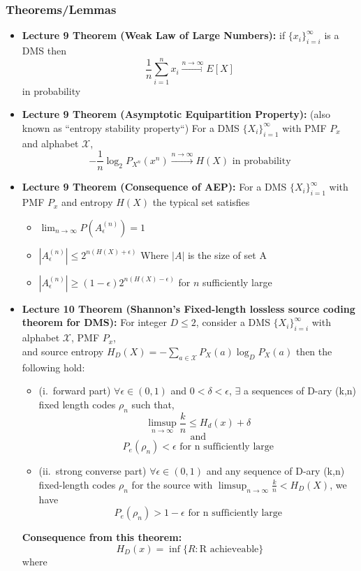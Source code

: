 \documentclass{article}
\begin{document}
\subsubsection{Theorems/Lemmas}
\begin{itemize}
    \item \textbf{Lecture 9 Theorem (Weak Law of Large Numbers):} if \(\{x_i\}^{\infty}_{i=i}\) is a DMS then 
\[\frac{1}{n} \sum^n_{i=1} x_i \xrightarrow{n\to\infty} E[X]\] in probability
    \item \textbf{Lecture 9 Theorem (Asymptotic Equipartition Property):} (also known as ``entropy stability property``)
    For a DMS \(\{X_i\}^\infty_{i=1}\) with PMF \(P_x\) and alphabet \(\mathcal{X}\),
    \[-\frac{1}{n} \log_2 P_{X^n}(x^n) \xrightarrow[]{n\to\infty}H(X) \text{ in probability}\]
    \item \textbf{Lecture 9 Theorem (Consequence of AEP):} For a DMS \(\{X_i\}_{i=1}^\infty\) with PMF \(P_x\) and entropy \(H(X)\) the typical set satisfies
    \begin{itemize}
        \item \(\lim_{n\to\infty} P(A_{\epsilon}^{(n)})=1\)
        \item \(|A_\epsilon^{(n)}| \leq 2^{n(H(X)+\epsilon)}\) Where \(|A|\) is the size of set A
        \item \(|A_\epsilon^{(n)}| \geq (1-\epsilon)2^{n(H(X)-\epsilon)}\) for \(n\) sufficiently large
    \end{itemize}
    \item \textbf{Lecture 10 Theorem (Shannon's Fixed-length lossless source coding theorem for DMS):} For integer \(D\leq2\), consider a DMS \(\{X_i\}^{\infty}_{i=i}\) with alphabet \(\mathcal{X}\), PMF \(P_x\), \\and
    source entropy \(H_D(X) = - \sum_{a \in \mathcal{X}} P_X(a) \log_D P_X(a)\) then the following hold:
    \begin{itemize}
        \item (i.\ forward part) \(\forall \epsilon \in (0,1)\) and \(0<\delta<\epsilon\), \(\exists\) a sequences of D-ary (k,n) fixed length codes \(\rho_n\) such that,
        \[\limsup_{n\to\infty}\frac{k}{n} \leq H_d(x) + \delta\] 
        \[\text{ and } \]
        \[P_e(\rho_n)< \epsilon \text{ for n sufficiently large}\]
        
        \item (ii.\ strong converse part) \(\forall \epsilon \in (0,1)\) and any sequence of D-ary (k,n) fixed-length codes \(\rho_n\) for the source with \(\limsup_{n\to\infty}\frac{k}{n}<H_D(X)\), we have
        \[P_e(\rho_n)>1-\epsilon \text{ for n sufficiently large}\]
    \end{itemize}
    \textbf{Consequence from this theorem:}
    \[H_D(x) = \inf \{R: \text{R achieveable}\}\]
    where
    


\end{itemize}
\end{document}
